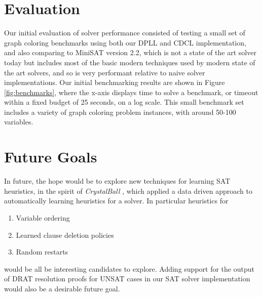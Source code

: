 \documentclass[12pt]{article}
\begin{document}

\section{Evaluation}

Our initial evaluation of solver performance consisted of testing a small set of graph coloring benchmarks using both our DPLL and CDCL implementation, and also comparing to MiniSAT version 2.2, which is not a state of the art solver today but includes most of the basic modern techniques used by modern state of the art solvers, and so is very performant relative to naive solver implementations. Our initial benchmarking results are shown in Figure \ref{fig:benchmarks}, where the x-axis displays time to solve a benchmark, or timeout within a fixed budget of 25 seconds, on a log scale. This small benchmark set includes a variety of graph coloring problem instances, with around 50-100 variables.


\section{Future Goals}

In future, the hope would be to explore new techniques for learning SAT heuristics, in the spirit of \textit{CrystalBall} \cite{2019sooscrystalball}, which applied a data driven approach to automatically learning heuristics for a solver. In particular heuristics for
\begin{enumerate}
    \item Variable ordering
    \item Learned clause deletion policies
    \item Random restarts
\end{enumerate}
would be all be interesting candidates to explore. Adding support for the output of DRAT resolution proofs \cite{2014dratproofs} for UNSAT cases in our SAT solver implementation would also be a desirable future goal.



\end{document}
